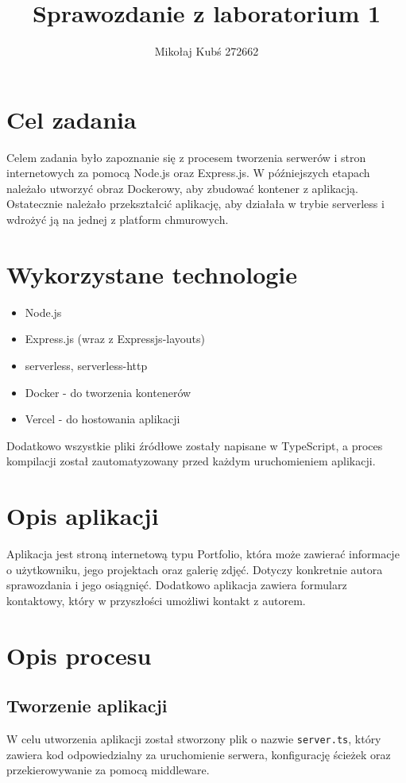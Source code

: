 \documentclass[a4paper,12pt]{article}
\title{Sprawozdanie z laboratorium 1}
\author{Mikołaj Kubś 272662}
\date{}
\begin{document}
\maketitle

\section{Cel zadania}
Celem zadania było zapoznanie się z procesem tworzenia serwerów i stron internetowych za pomocą Node.js oraz Express.js. W późniejszych etapach należało utworzyć obraz Dockerowy, aby zbudować kontener z aplikacją. Ostatecznie należało przekształcić aplikację, aby działała w trybie serverless i wdrożyć ją na jednej z platform chmurowych.

\section{Wykorzystane technologie}
\begin{itemize}
    \item Node.js
    \item Express.js (wraz z Expressjs-layouts)
    \item serverless, serverless-http
    \item Docker - do tworzenia kontenerów
    \item Vercel - do hostowania aplikacji
\end{itemize}

Dodatkowo wszystkie pliki źródłowe zostały napisane w TypeScript, a proces kompilacji został zautomatyzowany przed każdym uruchomieniem aplikacji.

\section{Opis aplikacji}
Aplikacja jest stroną internetową typu Portfolio, która może zawierać informacje o użytkowniku, jego projektach oraz galerię zdjęć. Dotyczy konkretnie autora sprawozdania i jego osiągnięć. Dodatkowo aplikacja zawiera formularz kontaktowy, który w przyszłości umożliwi kontakt z autorem.

\section{Opis procesu}
\subsection{Tworzenie aplikacji}
W celu utworzenia aplikacji został stworzony plik o nazwie \texttt{server.ts}, który zawiera kod odpowiedzialny za uruchomienie serwera, konfigurację ścieżek oraz przekierowywanie za pomocą middleware.
\end{document}
